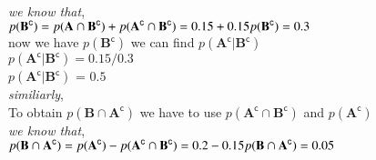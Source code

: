 \documentclass[journal,12pt,twocolumn]{IEEEtran}
\begin{document}
\\ \textit{we know that},
\\ $p(\textbf{B} ^\mathsf{c} )= p(\textbf{A} \cap \textbf{B} ^\mathsf{c}) + p(\textbf{A} ^\mathsf{c} \cap \textbf{B} ^\mathsf{c})
\\              =0.15 +0.15
\\ p(\textbf{B} ^\mathsf{c} )= 0.3$
\\ now we have $p(\textbf{B} ^\mathsf{c} )$ we can find $p(\textbf{A} ^\mathsf{c}|\textbf{B} ^\mathsf{c})$
\\ $p(\textbf{A} ^\mathsf{c}|\textbf{B} ^\mathsf{c})= 0.15/0.3$
\\ $p(\textbf{A} ^\mathsf{c}|\textbf{B} ^\mathsf{c})$ = $0.5$
\linebreak
\\ \textit{similiarly},
\\ To obtain $p(\textbf{B} \cap \textbf{A} ^\mathsf{c})$ we have to use $p(\textbf{A} ^\mathsf{c} \cap \textbf{B} ^\mathsf{c})$ and $p(\textbf{A}^\mathsf{c})$
\\ \textit{we know that},
\\ $p(\textbf{B} \cap \textbf{A} ^\mathsf{c})=p(\textbf{A}^\mathsf{c})-p(\textbf{A} ^\mathsf{c} \cap \textbf{B} ^\mathsf{c})
\\   =0.2-0.15
\\ p(\textbf{B} \cap \textbf{A} ^\mathsf{c})=0.05$
\end{document}
